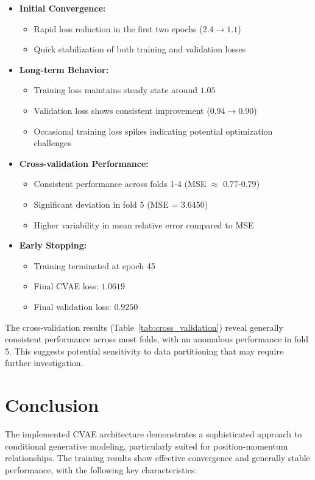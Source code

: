 \documentclass{article}
\begin{document}
\begin{itemize}
    \item \textbf{Initial Convergence:}
    \begin{itemize}
        \item Rapid loss reduction in the first two epochs ($2.4 \rightarrow 1.1$)
        \item Quick stabilization of both training and validation losses
    \end{itemize}
    
    \item \textbf{Long-term Behavior:}
    \begin{itemize}
        \item Training loss maintains steady state around $1.05$
        \item Validation loss shows consistent improvement ($0.94 \rightarrow 0.90$)
        \item Occasional training loss spikes indicating potential optimization challenges
    \end{itemize}
    
    \item \textbf{Cross-validation Performance:}
    \begin{itemize}
        \item Consistent performance across folds 1-4 (MSE $\approx$ $0.77$-$0.79$)
        \item Significant deviation in fold 5 (MSE = $3.6450$)
        \item Higher variability in mean relative error compared to MSE
    \end{itemize}
    
    \item \textbf{Early Stopping:}
    \begin{itemize}
        \item Training terminated at epoch 45
        \item Final CVAE loss: $1.0619$
        \item Final validation loss: $0.9250$
    \end{itemize}
\end{itemize}

The cross-validation results (Table~\ref{tab:cross_validation}) reveal generally consistent performance across most folds, with an anomalous performance in fold 5. This suggests potential sensitivity to data partitioning that may require further investigation.

\section{Conclusion}
The implemented CVAE architecture demonstrates a sophisticated approach to conditional generative modeling, particularly suited for position-momentum relationships. The training results show effective convergence and generally stable performance, with the following key characteristics:
\end{document}
